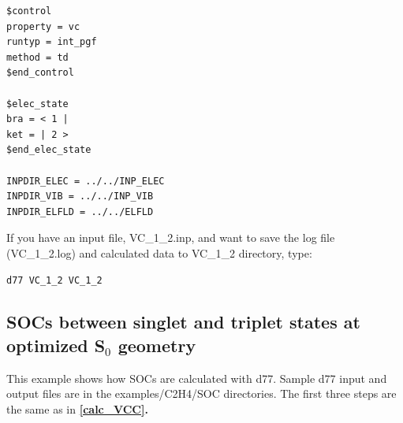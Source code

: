 ﻿\documentclass[11pt,a4paper,openany]{article}
\begin{document}
\begin{enumerate}
{\begin{verbatim}
$control
property = vc
runtyp = int_pgf
method = td
$end_control

$elec_state
bra = < 1 |
ket = | 2 >
$end_elec_state

INPDIR_ELEC = ../../INP_ELEC
INPDIR_VIB = ../../INP_VIB
INPDIR_ELFLD = ../../ELFLD
\end{verbatim}
If you have an input file, VC\_1\_2.inp, and want to save the log file (VC\_1\_2.log) and calculated data to VC\_1\_2 directory, type:
\begin{verbatim} 
d77 VC_1_2 VC_1_2
\end{verbatim}
}
\end{enumerate}

\subsection{SOCs between singlet and triplet states at optimized S$_0$ geometry}
This example shows how SOCs are calculated with d77. Sample d77 input and output files are in the examples/C2H4/SOC directories. The first three steps are the same as in \bf{\ref{calc_VCC}}\rm{.}
\end{document}
